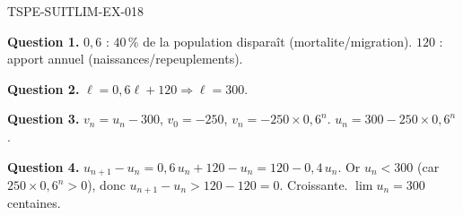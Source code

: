 \begin{corrige}{TSPE-SUITLIM-EX-018}

\textbf{Question 1.} $0{,}6$ : $40\,\%$ de la population disparaît (mortalite/migration). $120$ : apport annuel (naissances/repeuplements).

\textbf{Question 2.} $\ell = 0{,}6\ell + 120 \Rightarrow \ell = 300$.

\textbf{Question 3.} $v_n = u_n - 300$, $v_0 = -250$, $v_n = -250 \times 0{,}6^n$. $u_n = 300 - 250 \times 0{,}6^n$.

\textbf{Question 4.} $u_{n+1} - u_n = 0{,}6\,u_n + 120 - u_n = 120 - 0{,}4\,u_n$. Or $u_n < 300$ (car $250 \times 0{,}6^n > 0$), donc $u_{n+1} - u_n > 120 - 120 = 0$. Croissante. $\lim u_n = \boxed{300}$ centaines.

\end{corrige}
